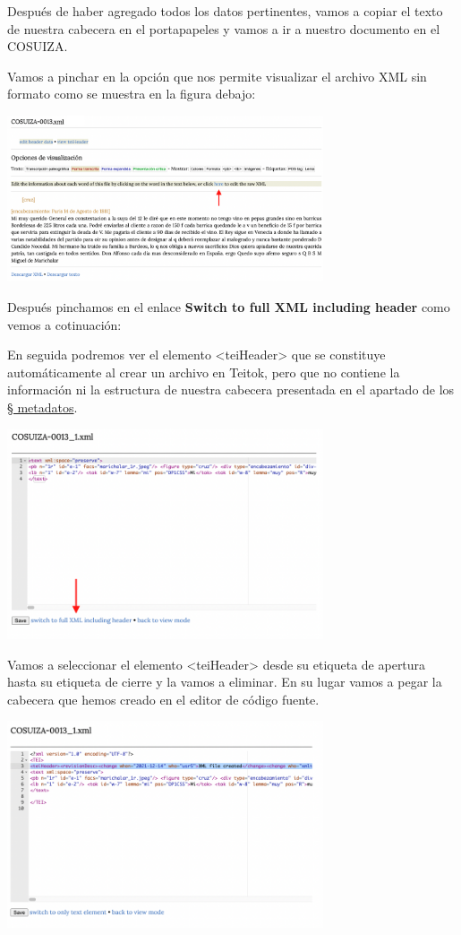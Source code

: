 \documentclass[
]{book}
\begin{document}
Después de haber agregado todos los datos pertinentes, vamos a copiar el texto de nuestra cabecera en el portapapeles y vamos a ir a nuestro documento en el COSUIZA.

Vamos a pinchar en la opción que nos permite visualizar el archivo XML sin formato como se muestra en la figura debajo:

\includegraphics[width=0.7\textwidth,height=\textheight]{img/editheader.png}

Después pinchamos en el enlace \textbf{Switch to full XML including header} como vemos a cotinuación:

En seguida podremos ver el elemento { \textless teiHeader\textgreater{}} que se constituye automáticamente al crear un archivo en Teitok, pero que no contiene la información ni la estructura de nuestra cabecera presentada en el apartado de los \protect\hyperlink{head123456}{§ metadatos}.

\includegraphics[width=0.7\textwidth,height=\textheight]{img/editheader2.png}

Vamos a seleccionar el elemento { \textless teiHeader\textgreater{}} desde su etiqueta de apertura hasta su etiqueta de cierre y la vamos a eliminar. En su lugar vamos a pegar la cabecera que hemos creado en el editor de código fuente.

\includegraphics[width=0.7\textwidth,height=\textheight]{img/editheader3.png}
\end{document}
